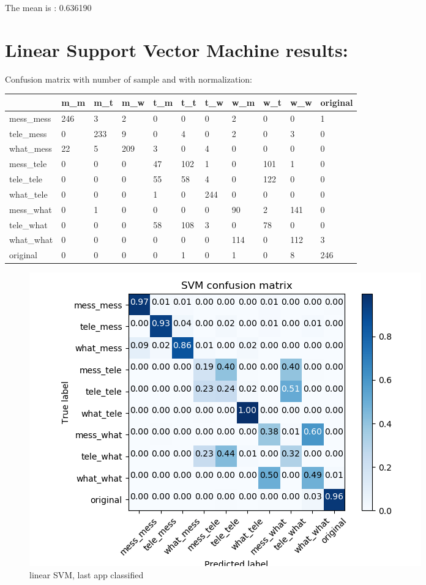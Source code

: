 The mean is : 0.636190\section{Linear Support Vector Machine results:} 
Confusion matrix with number of sample and with normalization:
 {\def\arraystretch{1.3} 
 \begin{table}[H] 
\centering 
\begin{tabular}{|l|l|l|l|l|l|l|l|l|l|l|} 
\hline 
  &m\_m  &m\_t  &m\_w  &t\_m  &t\_t  &t\_w  &w\_m  &w\_t  &w\_w  &original  \\ \hline
mess\_mess  &246  &3  &2  &0  &0  &0  &2  &0  &0  &1  \\ \hline
tele\_mess  &0  &233  &9  &0  &4  &0  &2  &0  &3  &0  \\ \hline
what\_mess  &22  &5  &209  &3  &0  &4  &0  &0  &0  &0  \\ \hline
mess\_tele  &0  &0  &0  &47  &102  &1  &0  &101  &1  &0  \\ \hline
tele\_tele  &0  &0  &0  &55  &58  &4  &0  &122  &0  &0  \\ \hline
what\_tele  &0  &0  &0  &1  &0  &244  &0  &0  &0  &0  \\ \hline
mess\_what  &0  &1  &0  &0  &0  &0  &90  &2  &141  &0  \\ \hline
tele\_what  &0  &0  &0  &58  &108  &3  &0  &78  &0  &0  \\ \hline
what\_what  &0  &0  &0  &0  &0  &0  &114  &0  &112  &3  \\ \hline
original  &0  &0  &0  &0  &1  &0  &1  &0  &8  &246  \\ \hline
\end{tabular} 
\end{table} }

 \begin{figure}[H] 
\centering 
\includegraphics[scale=.6]{images/lsvm_initial_double_complete.png} 
\caption{linear SVM, last app classified} 
\end{figure} 


